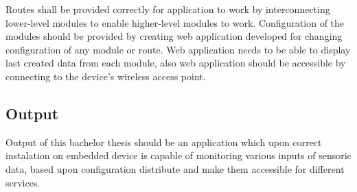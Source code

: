 Routes shall be provided correctly for application to work by interconnecting lower-level modules to enable higher-level modules to work. Configuration of the modules should be provided by creating web application developed for changing configuration of any module or route. Web application needs to be able to display last created data from each module, also web application should be accessible by connecting to the device's wireless access point.
\subsection{Output}
Output of this bachelor thesis should be an application which upon correct instalation on embedded device is capable of monitoring various inputs of sensoric data, based upon configuration distribute and make them accessible for different services.



